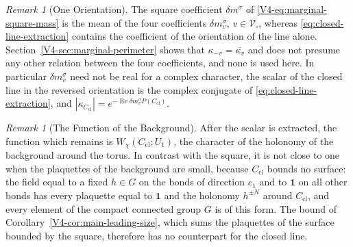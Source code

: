 \documentclass[11pt]{article}
\newcommand{\id}{\mathbf 1}
\numberwithin{equation}{section}
\theoremstyle{remark}
\newtheorem{remark}[theorem]{Remark}
\theoremstyle{plain}
\begin{document}
\begin{remark}[One Orientation]\label{rem:closed-line-orientation}
The square coefficient $\delta m^{\sigma}$ of \eqref{V4-eq:marginal-square-mass} is the mean of the four coefficients $\delta m^{\sigma}_v$, $v\in\mathscr V_{\square}$, whereas \eqref{eq:closed-line-extraction} contains the coefficient of the orientation of the line alone. Section~\ref{V4-sec:marginal-perimeter} shows that $\kappa_{-v}=\overline{\kappa_v}$ and does not presume any other relation between the four coefficients, and none is used here. In particular $\delta m^{\sigma}_v$ need not be real for a complex character, the scalar of the closed line in the reversed orientation is the complex conjugate of \eqref{eq:closed-line-extraction}, and $|\kappa_{C_{\mathrm{cl}}}|= e^{-\operatorname{Re}\delta m^{\sigma}_vP(C_{\mathrm{cl}})}$.
\end{remark}

\begin{remark}[The Function of the Background]\label{rem:closed-line-background}
After the scalar is extracted, the function which remains is $W_{\chi}(C_{\mathrm{cl}};U_1)$, the character of the holonomy of the background around the torus. In contrast with the square, it is not close to one when the plaquettes of the background are small, because $C_{\mathrm{cl}}$ bounds no surface: the field equal to a fixed $h\in G$ on the bonds of direction $e_1$ and to $\id$ on all other bonds has every plaquette equal to $\id$ and the holonomy $h^{\pm N}$ around $C_{\mathrm{cl}}$, and every element of the compact connected group $G$ is of this form. The bound of Corollary~\ref{V4-cor:main-leading-size}, which sums the plaquettes of the surface bounded by the square, therefore has no counterpart for the closed line.
\end{remark}
\end{document}
